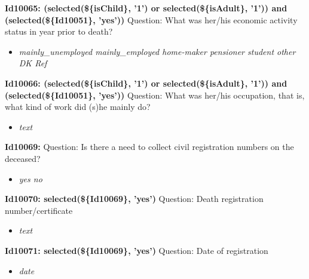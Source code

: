 \documentclass{article}%
\begin{document}
\textbf{Id10065: (selected(\$\{isChild\}, '1') or selected(\$\{isAdult\}, '1')) and (selected(\$\{Id10051\}, 'yes'))\newline%
}%
Question: What was her/his economic activity status in year prior to death?\newline%
%
\begin{itemize}%
\item%
\textit{mainly\_unemployed\newline%
 mainly\_employed\newline%
 home{-}maker\newline%
 pensioner\newline%
 student\newline%
 other\newline%
 DK\newline%
 Ref\newline%
}%
\end{itemize}%
\textbf{Id10066: (selected(\$\{isChild\}, '1') or selected(\$\{isAdult\}, '1')) and (selected(\$\{Id10051\}, 'yes'))\newline%
}%
Question: What was her/his occupation, that is, what kind of work did (s)he mainly do?\newline%
%
\begin{itemize}%
\item%
\textit{text\newline%
}%
\end{itemize}%
\textbf{Id10069: \newline%
}%
Question: Is there a need to collect civil registration numbers on the deceased?\newline%
%
\begin{itemize}%
\item%
\textit{yes\newline%
 no\newline%
}%
\end{itemize}%
\textbf{Id10070: selected(\$\{Id10069\}, 'yes')\newline%
}%
Question: Death registration number/certificate\newline%
%
\begin{itemize}%
\item%
\textit{text\newline%
}%
\end{itemize}%
\textbf{Id10071: selected(\$\{Id10069\}, 'yes')\newline%
}%
Question: Date of registration\newline%
%
\begin{itemize}%
\item%
\textit{date\newline%
}%
\end{itemize}%
\end{document}
